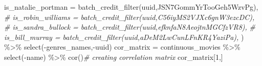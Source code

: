 \documentclass[
]{article}
\newenvironment{Shaded}{\begin{snugshade}}{\end{snugshade}}
\newcommand{\AttributeTok}[1]{\textcolor[rgb]{0.77,0.63,0.00}{#1}}
\newcommand{\CommentTok}[1]{\textcolor[rgb]{0.56,0.35,0.01}{\textit{#1}}}
\newcommand{\DecValTok}[1]{\textcolor[rgb]{0.00,0.00,0.81}{#1}}
\newcommand{\FunctionTok}[1]{\textcolor[rgb]{0.00,0.00,0.00}{#1}}
\newcommand{\NormalTok}[1]{#1}
\newcommand{\OtherTok}[1]{\textcolor[rgb]{0.56,0.35,0.01}{#1}}
\newcommand{\SpecialCharTok}[1]{\textcolor[rgb]{0.00,0.00,0.00}{#1}}
\newcommand{\StringTok}[1]{\textcolor[rgb]{0.31,0.60,0.02}{#1}}
\begin{document}
\begin{Shaded}
\begin{Highlighting}[]
    \AttributeTok{is\_natalie\_portman =} \FunctionTok{batch\_credit\_filter}\NormalTok{(uuid,}\StringTok{\textquotesingle{}JSN7GommYrTooGeh5WzvPg\textquotesingle{}}\NormalTok{),}
    \CommentTok{\# is\_robin\_williams = batch\_credit\_filter(uuid,\textquotesingle{}C56iyMS2VJXc6gnW3ezcDC\textquotesingle{}),}
    \CommentTok{\# is\_sandra\_bullock = batch\_credit\_filter(uuid,\textquotesingle{}efknfaN8AeojtnMGCfzVR8\textquotesingle{}),}
    \CommentTok{\# is\_bill\_murray = batch\_credit\_filter(uuid,\textquotesingle{}aDeM2LwCunLFnKR4YaziPa\textquotesingle{}),}
\NormalTok{  ) }\SpecialCharTok{\%\textgreater{}\%} \FunctionTok{select}\NormalTok{(}\SpecialCharTok{{-}}\NormalTok{genres\_names,}\SpecialCharTok{{-}}\NormalTok{uuid)}
\NormalTok{cor\_matrix }\OtherTok{=}\NormalTok{ continuous\_movies }\SpecialCharTok{\%\textgreater{}\%} \FunctionTok{select}\NormalTok{(}\SpecialCharTok{{-}}\NormalTok{name) }\SpecialCharTok{\%\textgreater{}\%} \FunctionTok{cor}\NormalTok{()}\CommentTok{\# creating correlation matrix}
\NormalTok{cor\_matrix[}\DecValTok{1}\NormalTok{,]}
\end{Highlighting}
\end{Shaded}
\end{document}
